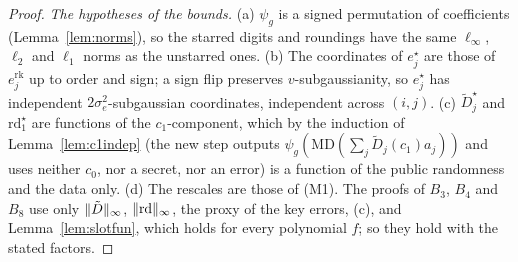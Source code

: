 \begin{proof}
\emph{The hypotheses of the bounds.} (a) $\psi_g$ is a signed permutation of coefficients (Lemma~\ref{lem:norms}), so the starred digits and roundings have the same $\ell_\infty$, $\ell_2$ and $\ell_1$ norms as the unstarred ones. (b) The coordinates of $e^\star_j$ are those of $e^{\mathrm{rk}}_j$ up to order and sign; a sign flip preserves $v$-subgaussianity, so $e^\star_j$ has independent $2\sigma_e^2$-subgaussian coordinates, independent across $(i,j)$. (c) $\tilde D^\star_j$ and $\mathrm{rd}^\star_1$ are functions of the $c_1$-component, which by the induction of Lemma~\ref{lem:c1indep} (the new step outputs $\psi_g(\mathrm{MD}(\sum_j\tilde D_j(c_1)a_j))$ and uses neither $c_0$, nor a secret, nor an error) is a function of the public randomness and the data only. (d) The rescales are those of (M1). The proofs of $B_3$, $B_4$ and $B_8$ use only $\lVert \tilde D\rVert_\infty$, $\lVert \mathrm{rd}\rVert_\infty$, the proxy of the key errors, (c), and Lemma~\ref{lem:slotfun}, which holds for every polynomial $f$; so they hold with the stated factors.
\end{proof}

